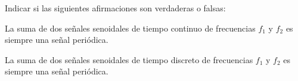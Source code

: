 \begin{ejercicio}
    Indicar si las siguientes afirmaciones son verdaderas o falsas:
    
    \inciso La suma de dos señales senoidales de tiempo continuo de frecuencias $f_1$ y $f_2$ es siempre una señal periódica. 
    
    \inciso La suma de dos señales senoidales de tiempo discreto de frecuencias $f_1$ y $f_2$ es siempre una señal periódica. 
    
\end{ejercicio}


